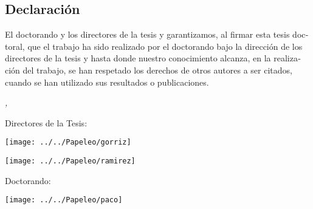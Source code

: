 \begin{otherlanguage}{spanish}
\chapter*{Declaración}

\thispagestyle{empty}
\bigskip
El doctorando \myName y los directores de la tesis \myProf y \myOtherProf garantizamos, al firmar esta tesis doctoral, que el trabajo ha sido realizado por el doctorando bajo la dirección de los directores de la tesis y hasta donde nuestro conocimiento alcanza, en la realización del trabajo, se han respetado los derechos de otros autores a ser citados, cuando se han utilizado sus resultados o publicaciones.  

\bigskip
\bigskip
\noindent\textit{\myLocation, \myTime}

\bigskip
\bigskip


\noindent\begin{minipage}[t]{0.45\textwidth}
\centering Directores de la Tesis: 
\begin{center}
\texttt{[image: ../../Papeleo/gorriz]}
\end{center}
\myProf

\begin{center}
	\texttt{[image: ../../Papeleo/ramirez]}
\end{center}
\myOtherProf
\end{minipage} 
\hfill
\noindent\begin{minipage}[t]{0.45\textwidth}
\centering Doctorando: 

\begin{center}
	\texttt{[image: ../../Papeleo/paco]}
\end{center}
\myName
\end{minipage}

\end{otherlanguage}
